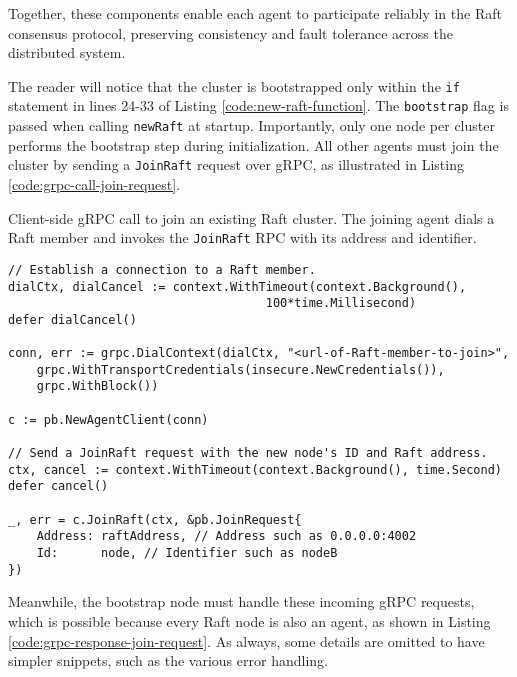 Together, these components enable each agent to participate reliably in the Raft consensus protocol, preserving consistency and fault tolerance across the distributed system.

The reader will notice that the cluster is bootstrapped only within the \texttt{if} statement in lines 24-33 of Listing \ref{code:new-raft-function}. The \texttt{bootstrap} flag is passed when calling \texttt{newRaft} at startup. Importantly, only one node per cluster performs the bootstrap step during initialization. All other agents must join the cluster by sending a \texttt{JoinRaft} request over gRPC, as illustrated in Listing \ref{code:grpc-call-join-request}.

\begin{listing}[H]
\caption{Client-side gRPC call to join an existing Raft cluster. The joining agent dials a Raft member and invokes the \texttt{JoinRaft} RPC with its address and identifier.}
\label{code:grpc-call-join-request}
\begin{verbatim}
// Establish a connection to a Raft member.
dialCtx, dialCancel := context.WithTimeout(context.Background(),
                                    100*time.Millisecond)
defer dialCancel()

conn, err := grpc.DialContext(dialCtx, "<url-of-Raft-member-to-join>",
    grpc.WithTransportCredentials(insecure.NewCredentials()),
    grpc.WithBlock())

c := pb.NewAgentClient(conn)

// Send a JoinRaft request with the new node's ID and Raft address.
ctx, cancel := context.WithTimeout(context.Background(), time.Second)
defer cancel()

_, err = c.JoinRaft(ctx, &pb.JoinRequest{
    Address: raftAddress, // Address such as 0.0.0.0:4002
    Id:      node, // Identifier such as nodeB
})
\end{verbatim}
\end{listing}

Meanwhile, the bootstrap node must handle these incoming gRPC requests, which is possible because every Raft node is also an agent, as shown in Listing \ref{code:grpc-response-join-request}. As always, some details are omitted to have simpler snippets, such as the various error handling.

